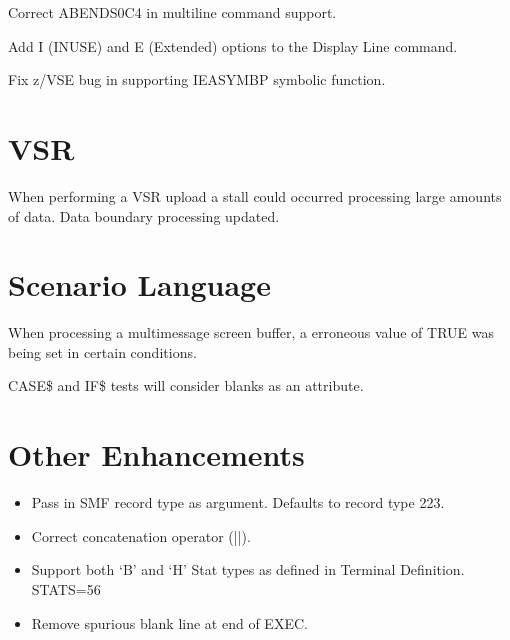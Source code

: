 \documentclass[letterpaper,10pt,english]{sphinxmanual}
\begin{document}
\sphinxAtStartPar
Correct ABENDS0C4 in multi\sphinxhyphen{}line command support.

\sphinxAtStartPar
{}

\sphinxAtStartPar
Add I (INUSE) and E (Extended) options to the Display Line command.

\sphinxAtStartPar
{}

\sphinxAtStartPar
Fix z/VSE bug in supporting IEASYMBP symbolic function.


\section{VSR}
\label{\detokenize{TN202403:vsr}}
\sphinxAtStartPar
{}

\sphinxAtStartPar
When performing a VSR upload a stall could occurred processing large amounts of data. Data boundary processing updated.

\newpage


\section{Scenario Language}
\label{\detokenize{TN202403:scenario-language}}
\sphinxAtStartPar
{}

\sphinxAtStartPar
When processing a multi\sphinxhyphen{}message screen buffer, a erroneous value of TRUE was being set in certain conditions.

\sphinxAtStartPar
{}

\sphinxAtStartPar
CASE\$ and IF\$ tests will consider blanks as an attribute.

\newpage


\section{Other Enhancements}
\label{\detokenize{TN202403:other-enhancements}}
\sphinxAtStartPar
{}
\begin{itemize}
\item {} 
\sphinxAtStartPar
Pass in SMF record type as argument. Defaults to record type 223.

\item {} 
\sphinxAtStartPar
Correct concatenation operator (||).

\item {} 
\sphinxAtStartPar
Support both ‘B’ and ‘H’ Stat types as defined in Terminal Definition. STATS=56

\item {} 
\sphinxAtStartPar
Remove spurious blank line at end of EXEC.

\end{itemize}
\end{document}
